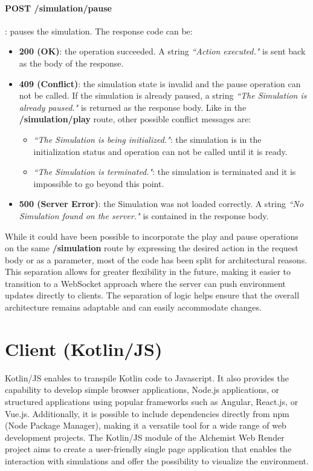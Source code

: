 \paragraph{POST /simulation/pause}: pauses the simulation. The response code can be:
\begin{itemize}
	\item \textbf{200 (OK)}: the operation succeeded. A string \textit{``Action executed."} is sent back as the body of the response.
	\item \textbf{409 (Conflict)}: the simulation state is invalid and the pause operation can not be called. If the simulation is already paused, a string \textit{``The Simulation is already paused."} is returned as the response body. Like in the \textbf{/simulation/play} route, other possible conflict messages are:
	\begin{itemize}
		\item \textit{``The Simulation is being initialized."}: the simulation is in the initialization status and operation can not be called until it is ready.
		\item \textit{``The Simulation is terminated."}: the simulation is terminated and it is impossible to go beyond this point.
	\end{itemize}
	\item \textbf{500 (Server Error)}: the Simulation was not loaded correctly. A string \textit{``No Simulation found on the server."} is contained in the response body.
\end{itemize}

While it could have been possible to incorporate the play and pause operations on the same \textbf{/simulation} route by expressing the desired action in the request body or as a parameter, most of the code has been split for architectural reasons. This separation allows for greater flexibility in the future, making it easier to transition to a WebSocket approach where the server can push environment updates directly to clients. The separation of logic helps ensure that the overall architecture remains adaptable and can easily accommodate changes.

\section{Client (Kotlin/JS)}
\label{sec:client-kotlin-js}
Kotlin/JS enables to transpile Kotlin code to Javascript. It also provides the capability to develop simple browser applications, Node.js applications, or structured applications using popular frameworks such as Angular, React.js, or Vue.js. Additionally, it is possible to include dependencies directly from npm (Node Package Manager), making it a versatile tool for a wide range of web development projects. The Kotlin/JS module of the Alchemist Web Render project aims to create a user-friendly single page application that enables the interaction with simulations and offer the possibility to visualize the environment.
